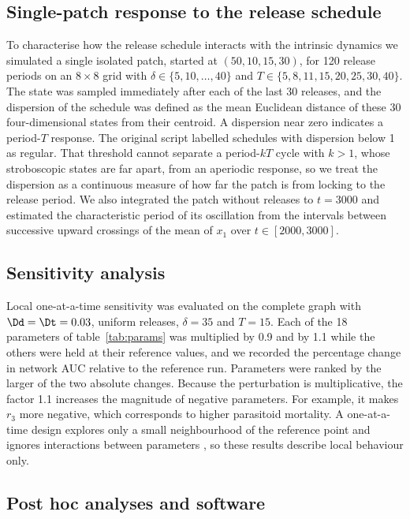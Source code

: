 \subsection{Single-patch response to the release schedule}
\label{sec:strobe}

To characterise how the release schedule interacts with the intrinsic dynamics we simulated a single isolated patch, started at $(50,10,15,30)$, for 120 release periods on an $8\times8$ grid with $\delta\in\{5,10,\dots,40\}$ and $T\in\{5,8,11,15,20,25,30,40\}$. The state was sampled immediately after each of the last 30 releases, and the dispersion of the schedule was defined as the mean Euclidean distance of these 30 four-dimensional states from their centroid. A dispersion near zero indicates a period-$T$ response. The original script labelled schedules with dispersion below 1 as regular. That threshold cannot separate a period-$kT$ cycle with $k > 1$, whose stroboscopic states are far apart, from an aperiodic response, so we treat the dispersion as a continuous measure of how far the patch is from locking to the release period. We also integrated the patch without releases to $t = 3000$ and estimated the characteristic period of its oscillation from the intervals between successive upward crossings of the mean of $x_1$ over $t\in[2000,3000]$.

\subsection{Sensitivity analysis}
\label{sec:sensitivity}

Local one-at-a-time sensitivity was evaluated on the complete graph with $\Dd = \Dt = 0.03$, uniform releases, $\delta = 35$ and $T = 15$. Each of the 18 parameters of table~\ref{tab:params} was multiplied by 0.9 and by 1.1 while the others were held at their reference values, and we recorded the percentage change in network AUC relative to the reference run. Parameters were ranked by the larger of the two absolute changes. Because the perturbation is multiplicative, the factor 1.1 increases the magnitude of negative parameters. For example, it makes $r_3$ more negative, which corresponds to higher parasitoid mortality. A one-at-a-time design explores only a small neighbourhood of the reference point and ignores interactions between parameters \citep{saltelli2019}, so these results describe local behaviour only.

\subsection{Post hoc analyses and software}
\label{sec:software}

